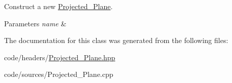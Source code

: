 Construct a new \mbox{\hyperlink{classprz_1_1_projected___plane}{Projected\+\_\+\+Plane}}. 


\begin{DoxyParams}{Parameters}
{\em name} & \\
\hline
\end{DoxyParams}


The documentation for this class was generated from the following files\+:\begin{DoxyCompactItemize}
\item 
code/headers/\mbox{\hyperlink{_projected___plane_8hpp}{Projected\+\_\+\+Plane.\+hpp}}\item 
code/sources/Projected\+\_\+\+Plane.\+cpp\end{DoxyCompactItemize}
